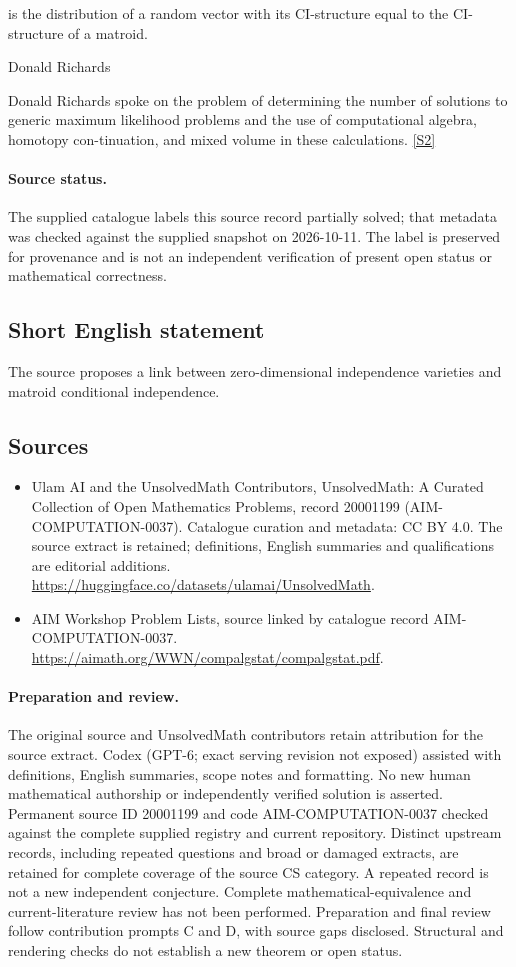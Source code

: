 \documentclass[11pt]{article}
\newcommand{\sref}[2]{\hyperlink{source:#1:#2}{[S#2]}}
\begin{document}
is the distribution of a random vector with its CI-structure equal to the CI-structure of a matroid.

Donald Richards

Donald Richards spoke on the problem of determining the number of solutions to generic maximum likelihood problems and the use of computational algebra, homotopy con-tinuation, and mixed volume in these calculations. \sref{20001199}{2}
\paragraph{Source status.}
The supplied catalogue labels this source record partially solved; that metadata was checked against the supplied snapshot on 2026-10-11. The label is preserved for provenance and is not an independent verification of present open status or mathematical correctness.
\subsection{Short English statement}
The source proposes a link between zero-dimensional independence varieties and matroid conditional independence.
\subsection{Sources}
\begin{itemize}
\item[\hypertarget{source:20001199:1}{S1}] Ulam AI and the UnsolvedMath Contributors, UnsolvedMath: A Curated Collection of Open Mathematics Problems, record 20001199 (AIM-COMPUTATION-0037). Catalogue curation and metadata: CC BY 4.0. The source extract is retained; definitions, English summaries and qualifications are editorial additions.
\url{https://huggingface.co/datasets/ulamai/UnsolvedMath}.
\item[\hypertarget{source:20001199:2}{S2}] AIM Workshop Problem Lists, source linked by catalogue record AIM-COMPUTATION-0037.
\url{https://aimath.org/WWN/compalgstat/compalgstat.pdf}.
\end{itemize}
\paragraph{Preparation and review.}
The original source and UnsolvedMath contributors retain attribution for the source extract. Codex (GPT-6; exact serving revision not exposed) assisted with definitions, English summaries, scope notes and formatting. No new human mathematical authorship or independently verified solution is asserted. Permanent source ID 20001199 and code AIM-COMPUTATION-0037 checked against the complete supplied registry and current repository. Distinct upstream records, including repeated questions and broad or damaged extracts, are retained for complete coverage of the source CS category. A repeated record is not a new independent conjecture. Complete mathematical-equivalence and current-literature review has not been performed. Preparation and final review follow contribution prompts C and D, with source gaps disclosed. Structural and rendering checks do not establish a new theorem or open status.
\label{end:20001199}
\end{document}
